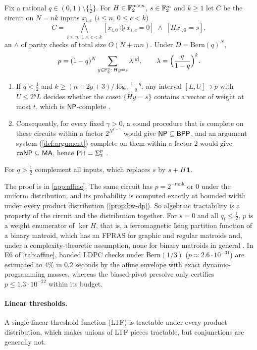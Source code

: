 \begin{theorem}\label{thm:biased-hard}
Fix a rational $q\in(0,1)\setminus\{\frac12\}$. For $H\in\mathbb{F}_2^{m\times n}$,
$s\in\mathbb{F}_2^m$ and $k\ge1$ let $C$ be the circuit on $N=nk$ inputs $x_{i,c}$ ($i\le n$,
$0\le c<k$)
\[
C=\bigwedge_{i\le n,\;1\le c<k}[x_{i,0}\oplus x_{i,c}=0]\;\wedge\;[Hx_{\cdot,0}=s],
\]
an $\wedge$ of parity checks of total size $O(N+mn)$. Under $D=\mathrm{Bern}(q)^N$,
\[
p=(1-q)^N\sum_{y\in\mathbb{F}_2^n:\,Hy=s}\lambda^{|y|},\qquad\lambda=\Big(\frac q{1-q}\Big)^k.
\]
\begin{enumerate}[label=(\alph*)]
\item If $q<\frac12$ and $k\ge(n+2g+3)/\log_2\frac{1-q}q$, any interval $[L,U]\ni p$
with $U\le2^gL$ decides whether the coset $\{Hy=s\}$ contains a vector of weight at
most $t$, which is $\mathsf{NP}$-complete \cite{bmvt1978}.
\item Consequently, for every fixed $\gamma>0$, a sound procedure that is complete on
these circuits within a factor $2^{N^{1-\gamma}}$ would give $\mathsf{NP}\subseteq\mathsf{BPP}$, and an
argument system (\cref{def:argument}) complete on them within a factor $2$ would give
$\mathsf{coNP}\subseteq\mathsf{MA}$, hence $\mathsf{PH}=\Sigma_2^p$ \cite{bhz1987}.
\end{enumerate}
For $q>\frac12$ complement all inputs, which replaces $s$ by $s+H\mathbf{1}$.
\end{theorem}

The proof is in \cref{app:affine}. The same circuit has $p=2^{-\mathrm{rank}}$ or $0$
under the uniform distribution, and its probability is computed exactly at bounded
width under every product distribution (\cref{prop:bw-dp}). So algebraic tractability
is a property of the circuit and the distribution together. For $s=0$ and all
$q_i\le\frac12$, $p$ is a weight enumerator of $\ker H$, that is, a ferromagnetic
Ising partition function of a binary matroid, which has an FPRAS for graphic
\cite{jerrumsinclair1993} and regular \cite{goldbergjerrum2013regular} matroids and,
under a complexity-theoretic assumption, none for binary matroids in general
\cite{goldbergjerrum2013binary}. In E6 of \cref{tab:affine}, banded LDPC checks
under $\mathrm{Bern}(1/3)$ ($p\approx2.6\cdot10^{-31}$) are estimated to $4\%$ in
$0.2$ seconds by the affine envelope with exact dynamic-programming masses, whereas the
biased-pivot presolve only certifies $p\le1.3\cdot10^{-22}$ within its budget.

\paragraph{Linear thresholds.}
A single linear threshold function (LTF) is tractable under every product
distribution, which makes unions of LTF pieces tractable, but conjunctions are
generally not.

